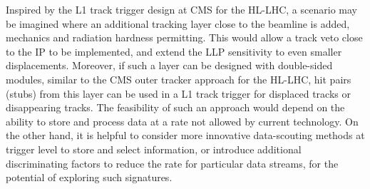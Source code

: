 \begin{itemize}
Inspired by the L1 track trigger design at CMS for the HL-LHC, a scenario may be imagined where an additional tracking layer close to the beamline is added, mechanics and radiation hardness permitting. This would allow a track veto close to the IP to be implemented, and extend the LLP sensitivity to even smaller displacements. Moreover, if such a layer can be designed with double-sided modules, similar to the CMS outer tracker approach for the HL-LHC, hit pairs (stubs) from this layer can be used in a L1 track trigger for displaced tracks or disappearing tracks. The feasibility of such an approach would depend on the ability to store and process data at a rate not allowed by current technology. On the other hand, it is helpful to consider more innovative data-scouting methods at trigger level to store and select information, or introduce additional discriminating factors to reduce the rate for particular data streams, for the potential of exploring such signatures.





\end{itemize}
